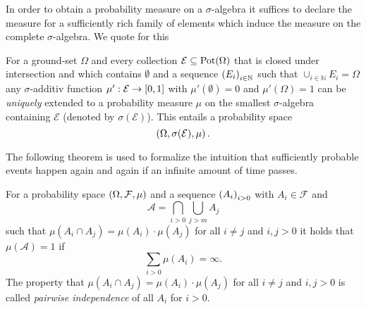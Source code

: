 In order to obtain a probability measure on a $\sigma$-algebra it suffices to
declare the measure for a sufficiently rich family of elements which induce the
measure on the complete $\sigma$-algebra. We quote for this
\begin{theorem}
  \cite[Theorem 2.4, Theorem 5.6]{Bauer}
  For a ground-set $\Omega$ and every collection
  $\mathcal{E}\subseteq\operatorname{Pot}(\Omega)$ that is closed under intersection and
  which contains $\emptyset$ and a sequence $\left(E_{i}\right)_{i\in\mathbb{N}}$ 
  such that $\cup_{i\in\mathbb{N}}E_{i} = \Omega$ any $\sigma$-additiv function
  $\mu':\mathcal{E}\rightarrow\left[0, 1\right]$
  with $\mu'(\emptyset) = 0$ and $\mu'(\Omega) = 1$ can be \emph{uniquely}
  extended to a probability measure $\mu$ on the smallest $\sigma$-algebra
  containing $\mathcal{E}$ (denoted by $\sigma(\mathcal{E})$). This entails a
  probability space
  \begin{equation*}
    \left(\Omega, \sigma(\mathcal{E}), \mu\right).
  \end{equation*}
  \label{thm:measureext}
\end{theorem}

The following theorem is used to formalize the intuition that sufficiently
probable events happen again and again if an infinite amount of time passes.
\begin{theorem}
  \cite[Theorem 2.7]{Klenke}\cite{BorelCantelliPairwise}
  For a probability space $\left(\Omega, \mathcal{F}, \mu\right)$ and a sequence 
  $\left(A_{i}\right)_{i>0}$ with $A_{i}\in\mathcal{F}$ and
  \begin{equation*}
    \mathcal{A} = \bigcap_{i > 0}\bigcup_{j > m}A_{j}
  \end{equation*}
  such that $\mu(A_{i}\cap A_{j}) = \mu(A_{i})\cdot\mu(A_{j})$ for all 
  $i \neq j$ and $i,j > 0$ it holds that $\mu(\mathcal{A}) = 1$ if
  \begin{equation*}
    \sum\limits_{i>0}\mu(A_{i}) = \infty.
  \end{equation*}
  The property that $\mu(A_{i}\cap A_{j}) = \mu(A_{i})\cdot\mu(A_{j})$ for 
  all $i \neq j$ and $i,j > 0$ is called \emph{pairwise independence} of 
  all $A_{i}$ for $i > 0$.
  \label{thm:BorelCantelli}
\end{theorem}

